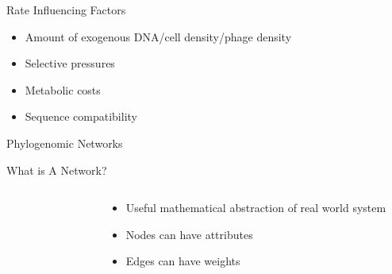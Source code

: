 \documentclass[dvipsnames]{beamer}
\begin{document}
\begin{frame}[fragile]{Rate Influencing Factors}
    \begin{itemize}
        \item<2-> Amount of exogenous DNA/cell density/phage density
        \item<3-> Selective pressures
        \item<4-> Metabolic costs
        \item<5-> Sequence compatibility
    \end{itemize}
\end{frame}
\begin{frame}{}%
    \begin{center}
        \Huge \textcolor{OliveGreen}{Phylogenomic Networks}
    \end{center}
    \addtocounter{framenumber}{-1}
\end{frame}
\begin{frame}[fragile]{What is A Network?}
\begin{columns}
    \begin{column}{0.5\textwidth}
        \begin{figure}[htb!]
        \end{figure}
        \autocite{bondy}
    \end{column}
    \begin{column}{0.5\textwidth}
        \begin{itemize}
            \item<2-> Useful mathematical abstraction of real world system
            \item<3-> Nodes can have attributes
            \item<4-> Edges can have weights
        \end{itemize}
    \end{column}
\end{columns}
\end{frame}
\end{document}

